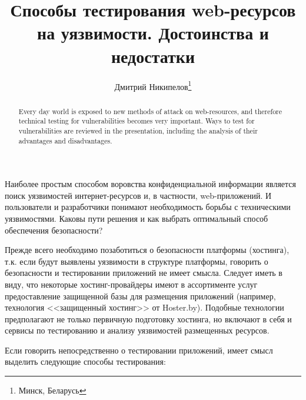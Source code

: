 \documentclass[10pt, a5paper]{article}
\begin{document}
\title{Способы тестирования web-ресурсов на уязвимости. Достоинства и недостатки}%

\author{Дмитрий  Никипелов\footnote{Минск, Беларусь}}
\maketitle

\begin{abstract}
Every day world is exposed to new methods of attack on web-resources, and therefore technical testing for vulnerabilities becomes very important. Ways to test for vulnerabilities are reviewed in the presentation, including the analysis of their advantages and disadvantages.
\end{abstract}

Наиболее простым способом воровства конфиденциальной информации является поиск уязвимостей интернет-ресурсов и, в частности, web-приложений. И пользователи и разработчики понимают необходимость борьбы с техническими уязвимостями. Каковы пути решения и как выбрать оптимальный способ обеспечения безопасности?

Прежде всего необходимо позаботиться о безопасности платформы (хостинга), т.к. если будут выявлены уязвимости в структуре платформы, говорить о безопасности и тестировании приложений не имеет смысла. Следует иметь в виду, что некоторые хостинг-провайдеры имеют в ассортименте услуг предоставление защищенной базы для размещения приложений (например, технология <<защищенный хостинг>> от Hoster.by). Подобные технологии предполагают не только первичную подготовку хостинга, но включают в себя и сервисы по тестированию и анализу уязвимостей размещенных ресурсов.

Если говорить непосредственно о тестировании приложений, имеет смысл выделить следующие способы тестирования:
\end{document}
